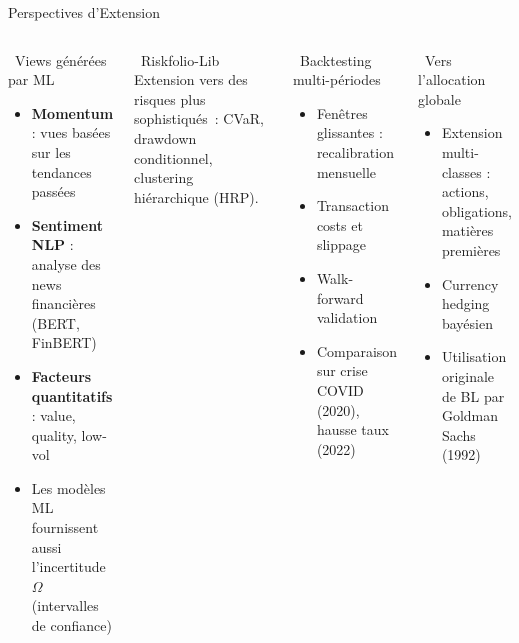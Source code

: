 \documentclass[aspectratio=169, 10pt, t]{beamer}
\begin{document}
\begin{frame}{Perspectives d'Extension}
  \begin{columns}[t]
      \begin{block}{\faRobot\ Views générées par ML}
        \small
        \begin{itemize}
          \setlength{\itemsep}{4pt}
          \item \textbf{Momentum} : vues basées sur les tendances passées
          \item \textbf{Sentiment NLP} : analyse des news financières
            (BERT, FinBERT)
          \item \textbf{Facteurs quantitatifs} : value, quality, low-vol
          \item Les modèles ML fournissent aussi l'incertitude $\Omega$
            (intervalles de confiance)
        \end{itemize}
      \end{block}
      \vspace{0.3em}
      \begin{exampleblock}{\small\faLayerGroup\ Riskfolio-Lib}
        \small
        Extension vers des risques plus sophistiqués~: CVaR,
        drawdown conditionnel, clustering hiérarchique (HRP).
      \end{exampleblock}
      \begin{block}{\faDatabase\ Backtesting multi-périodes}
        \small
        \begin{itemize}
          \setlength{\itemsep}{4pt}
          \item Fenêtres glissantes : recalibration mensuelle
          \item Transaction costs et slippage
          \item Walk-forward validation
          \item Comparaison sur crise COVID (2020), hausse taux (2022)
        \end{itemize}
      \end{block}
      \vspace{0.3em}
      \begin{block}{\faGlobeEurope\ Vers l'allocation globale}
        \small
        \begin{itemize}
          \setlength{\itemsep}{4pt}
          \item Extension multi-classes : actions, obligations, matières premières
          \item Currency hedging bayésien
          \item Utilisation originale de BL par Goldman Sachs (1992)
        \end{itemize}
      \end{block}
  \end{columns}
\end{frame}
\end{document}

